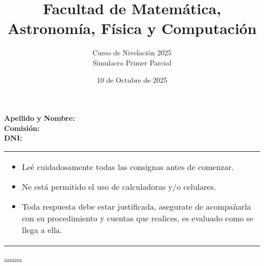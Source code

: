 \documentclass[a4paper]{article}
\title{Facultad de Matemática, Astronomía, Física y Computación}
\author{Curso de Nivelación 2025\\Simulacro Primer Parcial}
\date{10 de Octubre de 2025}
\begin{document}
\maketitle
\noindent\textbf{Apellido y Nombre:}\\
\textbf{Comisión:}\\
\textbf{DNI:}
\begin{tabular}{|l|}
    \begin{itemize}
        \item Leé cuidadosamente todas las consignas antes de comenzar.
        \item Ne está permitido el uso de calculadoras y/o celulares.
        \item Toda respuesta debe estar justificada, asegurate de acompañarla con su procedimiento y cuentas que realices, es evaluado como se llega a ella.
    \end{itemize}
\end{tabular}
aaaaa
\end{document}
